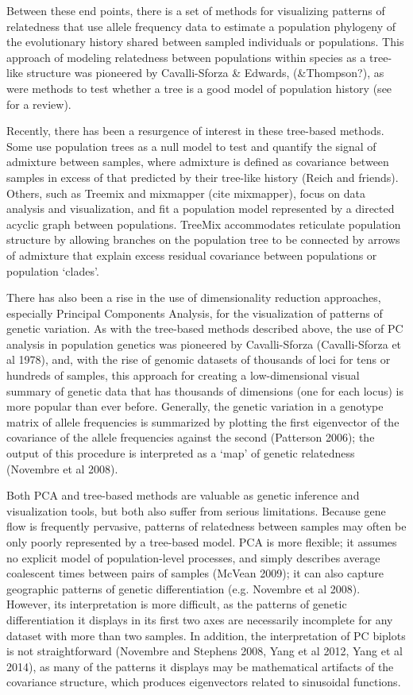 \documentclass[12pt]{article}
\begin{document}
Between these end points, there is a set of methods for visualizing patterns of relatedness that use allele frequency data to estimate a population phylogeny of the evolutionary history shared between sampled individuals or populations.  This approach of modeling relatedness between populations within species as a tree-like structure was pioneered by Cavalli-Sforza \& Edwards,  (\&Thompson?), as were methods to test whether a tree is a good model of population history \citep{treeness} (see \citep{Felsenstein} for a review).
 
Recently, there has been a resurgence of interest in these tree-based methods.  Some use population trees as a null model to test and quantify the signal of admixture between samples, where admixture is defined as covariance between samples in excess of that predicted by their tree-like history (Reich and friends).  Others, such as Treemix \citep{Pickrell} and mixmapper (cite mixmapper), focus on data analysis and visualization, and fit a population model represented by a directed acyclic graph between populations.  TreeMix accommodates reticulate population structure by allowing branches on the population tree to be connected by arrows of admixture that explain excess residual covariance between populations or population `clades'.

There has also been a rise in the use of dimensionality reduction approaches, especially Principal Components Analysis, for the visualization of patterns of genetic variation.  As with the tree-based methods described above, the use of PC analysis in population genetics was pioneered by Cavalli-Sforza (Cavalli-Sforza et al 1978), and, with the rise of genomic datasets of thousands of loci for tens or hundreds of samples, this approach for creating a low-dimensional visual summary of genetic data that has thousands of dimensions (one for each locus) is more popular than ever before.  Generally, the genetic variation in a genotype matrix of allele frequencies is summarized by plotting the first eigenvector of the covariance of the allele frequencies against the second (Patterson 2006); the output of this procedure is interpreted as a `map' of genetic relatedness (Novembre et al 2008).

Both PCA and tree-based methods are valuable as genetic inference and visualization tools, but both also suffer from serious limitations.  Because gene flow is frequently pervasive, patterns of relatedness between samples may often be only poorly represented by a tree-based model.  PCA is more flexible; it assumes no explicit model of population-level processes, and simply describes average coalescent times between pairs of samples (McVean 2009); it can  also capture geographic patterns of genetic differentiation (e.g. Novembre et al 2008).  However, its interpretation is more difficult, as the patterns of genetic differentiation it displays in its first two axes are necessarily incomplete for any dataset with more than two samples.  In addition, the interpretation of PC biplots is not straightforward (Novembre and Stephens 2008, Yang et al 2012, Yang et al 2014), as many of the patterns it displays may be mathematical artifacts of the covariance structure, which produces eigenvectors related to sinusoidal functions.
\end{document}
